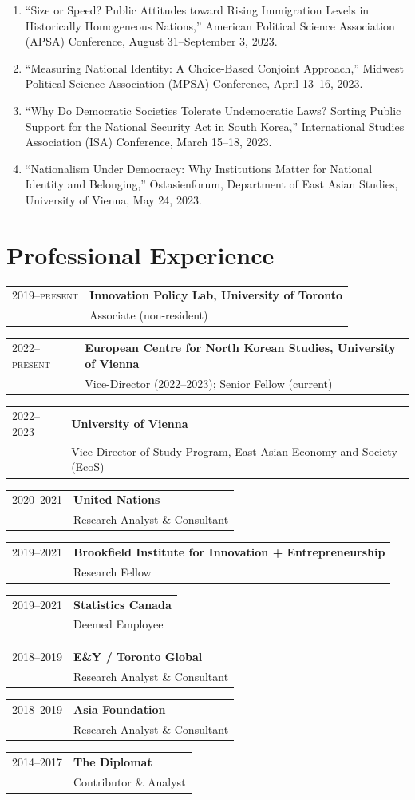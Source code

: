 \documentclass[11pt, a4paper]{article}
\makeatletter
\newcommand{\cventry}[3]{%
  \noindent
  \begin{tabularx}{\textwidth}{@{}p{2.4cm}X@{}}
    \textsc{#1} & \textbf{#2} \\
                 & #3
  \end{tabularx}\vspace{0.15em}%
}
\makeatother
\begin{document}
\begin{enumerate}[itemsep=0.15em]
  \item ``Size or Speed? Public Attitudes toward Rising Immigration Levels in Historically Homogeneous Nations,'' American Political Science Association (APSA) Conference, August 31--September 3, 2023.

  \item ``Measuring National Identity: A Choice-Based Conjoint Approach,'' Midwest Political Science Association (MPSA) Conference, April 13--16, 2023.

  \item ``Why Do Democratic Societies Tolerate Undemocratic Laws? Sorting Public Support for the National Security Act in South Korea,'' International Studies Association (ISA) Conference, March 15--18, 2023.

  \item ``Nationalism Under Democracy: Why Institutions Matter for National Identity and Belonging,'' Ostasienforum, Department of East Asian Studies, University of Vienna, May 24, 2023.
\end{enumerate}

\section{Professional Experience}

\cventry{2019--present}{Innovation Policy Lab, University of Toronto}
  {Associate (non-resident)}

\cventry{2022--present}{European Centre for North Korean Studies, University of Vienna}
  {Vice-Director (2022--2023); Senior Fellow (current)}

\cventry{2022--2023}{University of Vienna}
  {Vice-Director of Study Program, East Asian Economy and Society (EcoS)}

\cventry{2020--2021}{United Nations}
  {Research Analyst \& Consultant}

\cventry{2019--2021}{Brookfield Institute for Innovation + Entrepreneurship}
  {Research Fellow}

\cventry{2019--2021}{Statistics Canada}
  {Deemed Employee}

\cventry{2018--2019}{E\&Y / Toronto Global}
  {Research Analyst \& Consultant}

\cventry{2018--2019}{Asia Foundation}
  {Research Analyst \& Consultant}

\cventry{2014--2017}{The Diplomat}
  {Contributor \& Analyst}
\end{document}
